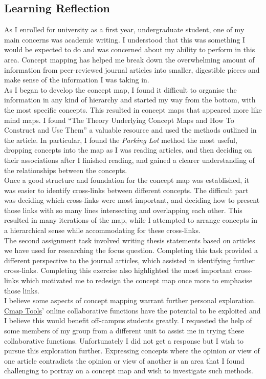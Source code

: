 \documentclass[12pt,a4paper]{report}
\begin{document}
\newpage
\subsection*{\textsf{Learning Reflection}}
As I enrolled for university as a first year, undergraduate student, one of my main concerns was academic writing. I understood that this was something I would be expected to do and was concerned about my ability to perform in this area. Concept mapping has helped me break down the overwhelming amount of information from peer-reviewed journal articles into smaller, digestible pieces and make sense of the information I was taking in.\\

As I began to develop the concept map, I found it difficult to organise the information in any kind of hierarchy and started my way from the bottom, with the most specific concepts. This resulted in concept maps that appeared more like mind maps. I found \citet{Novak2006} ``The Theory Underlying Concept Maps and How To Construct and Use Them'' a valuable resource and used the methods outlined in the article. In particular, I found the \emph{Parking Lot} method the most useful, dropping concepts into the map as I was reading articles, and then deciding on their associations after I finished reading, and gained a clearer understanding of the relationships between the concepts.\\

Once a good structure and foundation for the concept map was established, it was easier to identify cross-links between different concepts. The difficult part was deciding which cross-links were most important, and deciding how to present those links with so many lines intersecting and overlapping each other. This resulted in many iterations of the map, while I attempted to arrange concepts in a hierarchical sense while accommodating for these cross-links.\\

The second assignment task involved writing thesis statements based on articles we have used for researching the focus question. Completing this task provided a different perspective to the journal articles, which assisted in identifying further cross-links. Completing this exercise also highlighted the most important cross-links which motivated me to redesign the concept map once more to emphasise those links.\\

I believe some aspects of concept mapping warrant further personal exploration. \href{http://cmap.ihmc.us/}{Cmap Tools}' online collaborative functions have the potential to be exploited and I believe this would benefit off-campus students greatly. I requested the help of some members of my group from a different unit to assist me in trying these collaborative functions. Unfortunately I did not get a response but I wish to pursue this exploration further. Expressing concepts where the opinion or view of one article contradicts the opinion or view of another is an area that I found challenging to portray on a concept map and wish to investigate such methods.\\
\end{document}
